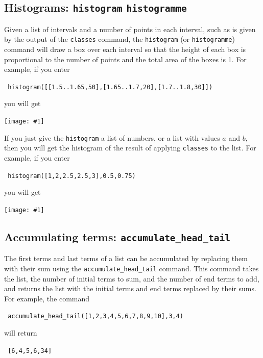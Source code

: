 \documentclass[a4paper,11pt]{book}
\newcommand{\includeimage}[1]
{\texttt{[image: \#1]}}
\begin{document}
\subsection{Histograms: \texttt{histogram} \texttt{histogramme}}

Given a list of intervals and a number of points in each interval,
such as is given by the output of the \texttt{classes} command, the
\texttt{histogram} (or \texttt{histogramme}) command will draw a box
over each interval so that the height of each box is proportional to
the number of points and the total area of the boxes is 1.  For
example, if you enter
\begin{center}
  \tt
  histogram([[1.5..1.65,50],[1.65..1.7,20],[1.7..1.8,30]])
\end{center}
you will get
\begin{center}
  \includeimage{xcas-histogram1.png}
\end{center}

If you just give the \texttt{histogram} a list of numbers, or a list
with values $a$ and $b$, then you will get the histogram of the result
of applying \texttt{classes} to the list.
For example, if you enter
\begin{center}
  \tt
  histogram([1,2,2.5,2.5,3],0.5,0.75)
\end{center}
you will get
\begin{center}
  \includeimage{xcas-histogram2.png}
\end{center}

\subsection{Accumulating terms:
\texttt{accumulate\_head\_tail}}

The first terms and last terms of a list can be accumulated by
replacing them with their sum using the \texttt{accumulate\_head\_tail}
command.  This command takes the list, the number of initial terms to
sum, and the number of end terms to add, and returns the list with the
initial terms and end terms replaced by their sums.  For example, the
command
\begin{center}
  \tt
  accumulate\_head\_tail([1,2,3,4,5,6,7,8,9,10],3,4)
\end{center}
will return
\begin{center}
  \tt
  [6,4,5,6,34]
\end{center}
\end{document}
